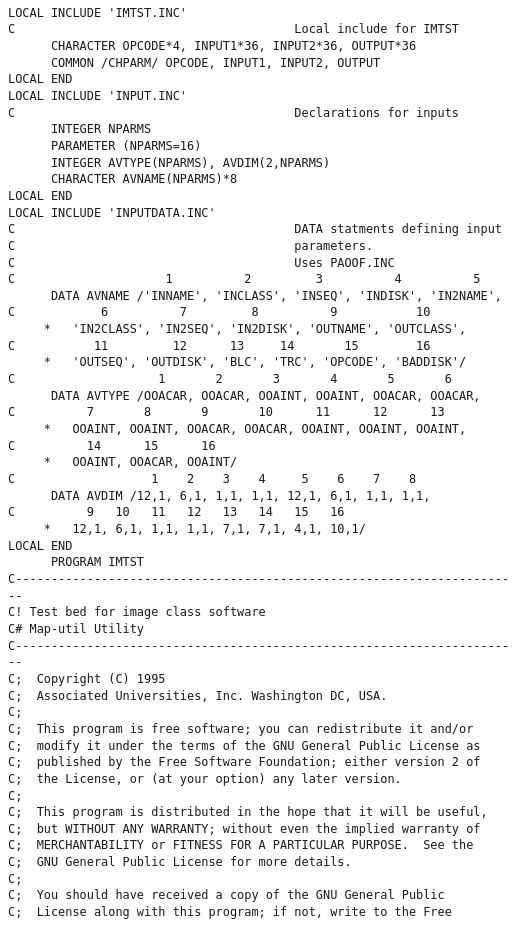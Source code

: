 {\small\begin{verbatim}

LOCAL INCLUDE 'IMTST.INC'
C                                       Local include for IMTST
      CHARACTER OPCODE*4, INPUT1*36, INPUT2*36, OUTPUT*36
      COMMON /CHPARM/ OPCODE, INPUT1, INPUT2, OUTPUT
LOCAL END
LOCAL INCLUDE 'INPUT.INC'
C                                       Declarations for inputs
      INTEGER NPARMS
      PARAMETER (NPARMS=16)
      INTEGER AVTYPE(NPARMS), AVDIM(2,NPARMS)
      CHARACTER AVNAME(NPARMS)*8
LOCAL END
LOCAL INCLUDE 'INPUTDATA.INC'
C                                       DATA statments defining input
C                                       parameters.
C                                       Uses PAOOF.INC
C                     1          2         3          4          5
      DATA AVNAME /'INNAME', 'INCLASS', 'INSEQ', 'INDISK', 'IN2NAME',
C            6          7         8          9           10
     *   'IN2CLASS', 'IN2SEQ', 'IN2DISK', 'OUTNAME', 'OUTCLASS',
C           11         12      13     14       15        16
     *   'OUTSEQ', 'OUTDISK', 'BLC', 'TRC', 'OPCODE', 'BADDISK'/
C                    1       2       3       4       5       6
      DATA AVTYPE /OOACAR, OOACAR, OOAINT, OOAINT, OOACAR, OOACAR,
C          7       8       9       10      11      12      13
     *   OOAINT, OOAINT, OOACAR, OOACAR, OOAINT, OOAINT, OOAINT,
C          14      15      16
     *   OOAINT, OOACAR, OOAINT/
C                   1    2    3    4     5    6    7    8
      DATA AVDIM /12,1, 6,1, 1,1, 1,1, 12,1, 6,1, 1,1, 1,1,
C          9   10   11   12   13   14   15   16
     *   12,1, 6,1, 1,1, 1,1, 7,1, 7,1, 4,1, 10,1/
LOCAL END
      PROGRAM IMTST
C-----------------------------------------------------------------------
C! Test bed for image class software
C# Map-util Utility
C-----------------------------------------------------------------------
C;  Copyright (C) 1995
C;  Associated Universities, Inc. Washington DC, USA.
C;
C;  This program is free software; you can redistribute it and/or
C;  modify it under the terms of the GNU General Public License as
C;  published by the Free Software Foundation; either version 2 of
C;  the License, or (at your option) any later version.
C;
C;  This program is distributed in the hope that it will be useful,
C;  but WITHOUT ANY WARRANTY; without even the implied warranty of
C;  MERCHANTABILITY or FITNESS FOR A PARTICULAR PURPOSE.  See the
C;  GNU General Public License for more details.
C;
C;  You should have received a copy of the GNU General Public
C;  License along with this program; if not, write to the Free

\end{verbatim}}
